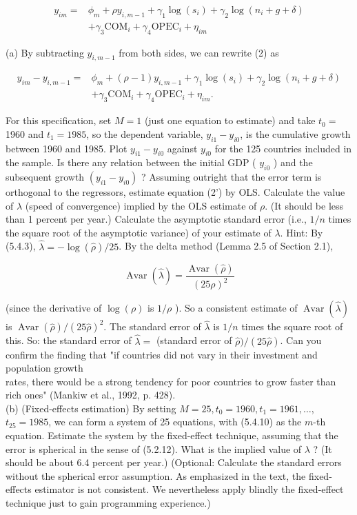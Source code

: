 \documentclass[10pt]{article}
\begin{document}
\begin{align*}
y_{i m}= & \phi_{m}+\rho y_{i, m-1}+\gamma_{1} \log \left(s_{i}\right)+\gamma_{2} \log \left(n_{i}+g+\delta\right) \\
& +\gamma_{3} \mathrm{COM}_{i}+\gamma_{4} \mathrm{OPEC}_{i}+\eta_{i m} \tag{2}
\end{align*}


(a) By subtracting $y_{i, m-1}$ from both sides, we can rewrite (2) as


\begin{align*}
y_{i m}-y_{i, m-1}= & \phi_{m}+(\rho-1) y_{i, m-1}+\gamma_{1} \log \left(s_{i}\right)+\gamma_{2} \log \left(n_{i}+g+\delta\right) \\
& +\gamma_{3} \mathrm{COM}_{i}+\gamma_{4} \mathrm{OPEC}_{i}+\eta_{i m} . \tag{$\prime$}
\end{align*}


For this specification, set $M=1$ (just one equation to estimate) and take $t_{0}=$ 1960 and $t_{1}=1985$, so the dependent variable, $y_{i 1}-y_{i 0}$, is the cumulative growth between 1960 and 1985. Plot $y_{i 1}-y_{i 0}$ against $y_{i 0}$ for the 125 countries included in the sample. Is there any relation between the initial GDP ( $y_{i 0}$ ) and the subsequent growth $\left(y_{i 1}-y_{i 0}\right)$ ? Assuming outright that the error term is orthogonal to the regressors, estimate equation (2') by OLS. Calculate the value of $\lambda$ (speed of convergence) implied by the OLS estimate of $\rho$. (It should be less than 1 percent per year.) Calculate the asymptotic standard error (i.e., $1 / n$ times the square root of the asymptotic variance) of your estimate of $\lambda$. Hint: By (5.4.3), $\hat{\lambda}=-\log (\hat{\rho}) / 25$. By the delta method (Lemma 2.5 of Section 2.1),

$$
\operatorname{Avar}(\hat{\lambda})=\frac{\operatorname{Avar}(\hat{\rho})}{(25 \rho)^{2}}
$$

(since the derivative of $\log (\rho)$ is $1 / \rho$ ). So a consistent estimate of $\operatorname{Avar}(\hat{\lambda})$ is $\widehat{\operatorname{Avar}(\hat{\rho})} /(25 \hat{\rho})^{2}$. The standard error of $\hat{\lambda}$ is $1 / n$ times the square root of this. So: the standard error of $\hat{\lambda}=$ (standard error of $\hat{\rho}) /(25 \hat{\rho})$. Can you confirm the finding that "if countries did not vary in their investment and population growth\\
rates, there would be a strong tendency for poor countries to grow faster than rich ones" (Mankiw et al., 1992, p. 428).\\
(b) (Fixed-effects estimation) By setting $M=25, t_{0}=1960, t_{1}=1961, \ldots$, $t_{25}=1985$, we can form a system of 25 equations, with (5.4.10) as the $m$-th equation. Estimate the system by the fixed-effect technique, assuming that the error is spherical in the sense of (5.2.12). What is the implied value of $\lambda$ ? (It should be about 6.4 percent per year.) (Optional: Calculate the standard errors without the spherical error assumption. As emphasized in the text, the fixed-effects estimator is not consistent. We nevertheless apply blindly the fixed-effect technique just to gain programming experience.)
\end{document}
